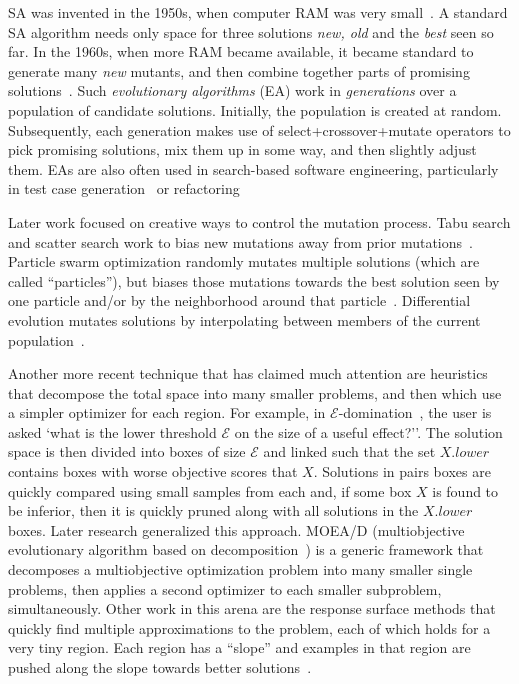 SA was invented   in the 1950s, when
 computer RAM was very small~\cite{kirkpatrick83}. A standard SA algorithm needs
 only space for three solutions {\em new, old} and the {\em best} seen so far.
  In the 1960s, when more RAM became available, it became standard to
 generate many {\em new} mutants, and then combine together parts of
 promising solutions~\cite{goldberg79}.  Such {\em evolutionary
   algorithms} (EA) work in {\em generations} over a population of
 candidate solutions.  Initially, the population is created at random.
 Subsequently, each generation makes use of select+crossover+mutate
 operators to pick promising solutions, mix them up in some way, and
 then slightly adjust them.
 EAs are also often used in search-based
 software engineering, particularly in test case generation~\cite{andrews07,andrews10}
 or refactoring~\cite{Weimer:2009}

 Later work focused on creative ways to control the
 mutation process. Tabu search and scatter search
 work to bias new mutations away from prior
 mutations~\cite{Glover1986563,Beausoleil2006426,Molina05sspmo:a,4455350}.
 Particle swarm
 optimization randomly mutates multiple solutions
 (which are called ``particles''), but biases those
 mutations towards the best solution seen by one
 particle and/or by the neighborhood around that
 particle~\cite{pan08}.
 Differential evolution mutates solutions by
 interpolating between members of the current
 population~\cite{storn1997differential}.  
 
Another more recent technique that has claimed much attention
are   heuristics that decompose the total space into many smaller problems, and then which use a simpler optimizer for each region. 
For example, in $\mathcal{E}$-domination~\cite{deb05}, the  user is asked
`what is the lower threshold $\mathcal{E}$ on the size of a useful effect?''. The solution space
is then divided into boxes of size $\mathcal{E}$ and linked such that  the  set $X.\mathit{lower}$ contains boxes with worse objective scores that $X$.  Solutions in pairs boxes are  quickly compared  using   small samples from each  and, if some box $X$ is found to be inferior, then it is quickly pruned along with all
solutions in the $X.\mathit{lower}$ boxes.
Later research generalized this approach. MOEA/D (multiobjective
evolutionary algorithm based on decomposition~\cite{zhang07}) is a generic framework that decomposes a multiobjective optimization problem into many smaller single problems, then applies a second optimizer to each smaller subproblem, simultaneously.   Other work in this arena are the response surface methods
that quickly find multiple approximations to the problem, each of which holds for a very tiny region.
Each region has a ``slope'' and examples in that region are pushed along the slope towards better
solutions~\cite{krall15,Zuluaga:13}.
 
